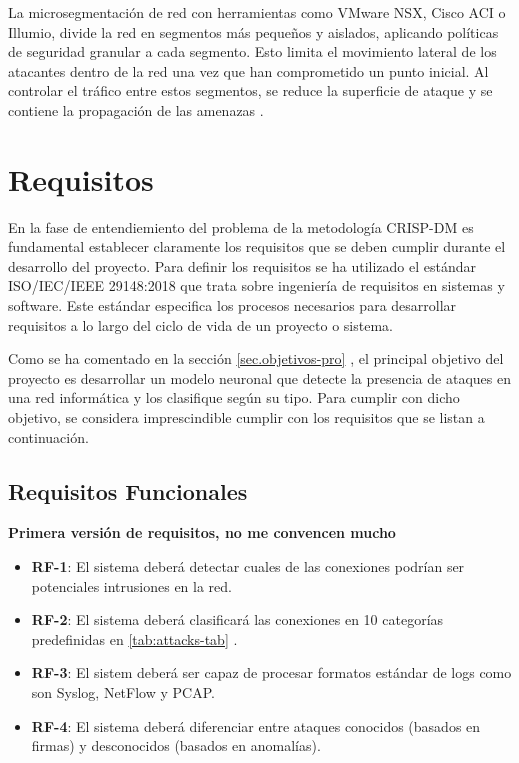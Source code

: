 La microsegmentación de red con herramientas como VMware NSX, Cisco ACI o Illumio, divide la red en segmentos más pequeños y aislados, aplicando políticas de seguridad granular a cada segmento. Esto limita el movimiento lateral de los atacantes dentro de la red una vez que han comprometido un punto inicial. Al controlar el tráfico entre estos segmentos, se reduce la superficie de ataque y se contiene la propagación de las amenazas \cite{paloaltonetworks_microsegmentation}.

\section{Requisitos}  \label{sec.requisitos} 
En la fase de entendiemiento del problema de la metodología CRISP-DM es fundamental establecer claramente los requisitos que se deben cumplir durante el desarrollo del proyecto. Para definir los requisitos se ha utilizado el estándar ISO/IEC/IEEE 29148:2018 \cite{ISO29148} que trata sobre ingeniería de requisitos en sistemas y software. Este estándar especifica los procesos necesarios para desarrollar requisitos a lo largo del ciclo de vida de un proyecto o sistema.

Como se ha comentado en la sección \ref{sec.objetivos-pro} , el principal objetivo del proyecto es desarrollar un modelo neuronal que detecte la presencia de ataques en una red informática y los clasifique según su tipo. Para cumplir con dicho objetivo, se considera imprescindible cumplir con los requisitos que se listan a continuación.

\subsection{Requisitos Funcionales}   \label{sec.req-funcionales}
\textbf{Primera versión de requisitos, no me convencen mucho}
\begin{itemize}  
    \item \textbf{RF-1}: El sistema deberá detectar cuales de las conexiones podrían ser potenciales intrusiones en la red.
    \item \textbf{RF-2}: El sistema deberá clasificará las conexiones en 10 categorías predefinidas en \ref{tab:attacks-tab} .  
	\item \textbf{RF-3}: El sistem deberá ser capaz de procesar formatos estándar de logs como son Syslog, NetFlow y PCAP.
	\item \textbf{RF-4}: El sistema deberá diferenciar entre ataques conocidos (basados en firmas) y desconocidos (basados en anomalías).
	
\end{itemize}  

